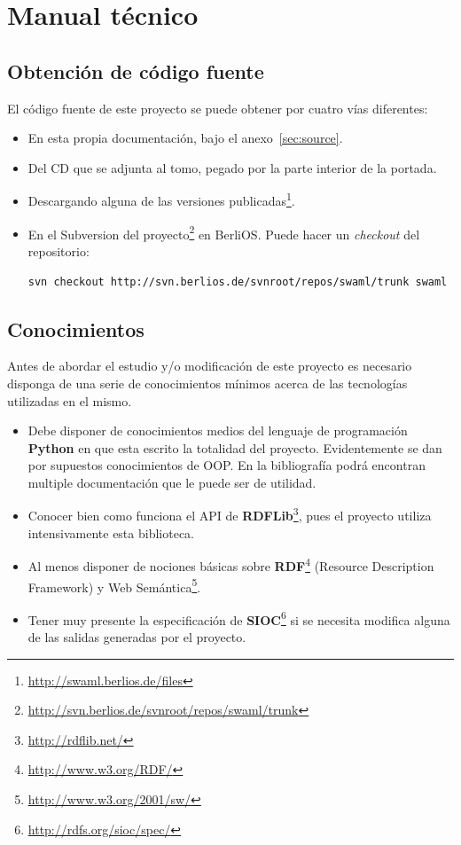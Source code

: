 
\section{Manual técnico}

\subsection*{Obtención de código fuente}

El código fuente de este proyecto se puede obtener por cuatro vías diferentes:

\begin{itemize}
  \item En esta propia documentación, bajo el anexo~\ref{sec:source}.
  \item Del CD que se adjunta al tomo, pegado por la parte interior
	de la portada.
  \item Descargando alguna de las versiones
	publicadas\footnote{\url{http://swaml.berlios.de/files}}.
  \item En el Subversion del proyecto\footnote{\url{http://svn.berlios.de/svnroot/repos/swaml/trunk}} 
	en BerliOS. Puede hacer un \emph{checkout} del repositorio:
	\begin{center}
	 \texttt{svn checkout http://svn.berlios.de/svnroot/repos/swaml/trunk swaml}
	\end{center}
\end{itemize}

\subsection*{Conocimientos}

Antes de abordar el estudio y/o modificación de este proyecto es necesario 
disponga de una serie de conocimientos mínimos acerca de las tecnologías
utilizadas en el mismo.

\begin{itemize}
  \item Debe disponer de conocimientos medios del lenguaje de programación 
	\textbf{Python} en que esta escrito la totalidad del proyecto. 
	Evidentemente se dan por supuestos conocimientos de OOP. En la
	bibliografía podrá encontran multiple documentación que le puede ser
	de utilidad.
  \item Conocer bien como funciona el API de 
	\textbf{RDFLib}\footnote{\url{http://rdflib.net/}}, pues el proyecto
	utiliza intensivamente esta biblioteca.
  \item Al menos disponer de nociones básicas sobre 
	\textbf{RDF}\footnote{\url{http://www.w3.org/RDF/}} (Resource Description 
	Framework) y Web Semántica\footnote{\url{http://www.w3.org/2001/sw/}}.
  \item Tener muy presente la especificación de 
	\textbf{SIOC}\footnote{\url{http://rdfs.org/sioc/spec/}} si se necesita
	modifica alguna de las salidas generadas por el proyecto.
\end{itemize}

